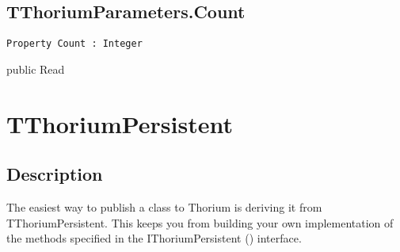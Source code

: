 \subsection{TThoriumParameters.Count}
\label{thoriumcorepkg:thorium:tthoriumparameters:count}
\begin{FPCList}
\Declaration 

\begin{verbatim}
Property Count : Integer
\end{verbatim}
\Visibility
public
\Access
Read
\end{FPCList}
\section{TThoriumPersistent}
\label{thoriumcorepkg:thorium:tthoriumpersistent}
\subsection{Description}
The easiest way to publish a class to Thorium is deriving it from TThoriumPersistent. This keeps you from building your own implementation of the methods specified in the IThoriumPersistent (\pageref{thoriumcorepkg:thorium:ithoriumpersistent}) interface. %
